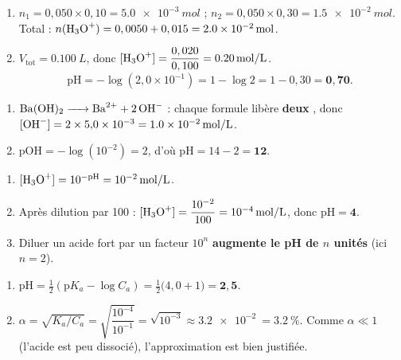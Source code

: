 \documentclass[11pt,a4paper]{article}
\begin{document}

\begin{corrige}
\begin{enumerate}[label=\alph*)]
  \item $n_1 = 0,050 \times 0,10 = \qty{5,0e-3}{mol}$ ; $n_2 = 0,050 \times 0,30 = \qty{1,5e-2}{mol}$.
        Total : $n(\ce{H3O+}) = 0,0050 + 0,015 = \qty{2,0e-2}{mol}$.
  \item $V_{\text{tot}} = \qty{0,100}{L}$, donc $[\ce{H3O+}] = \dfrac{0,020}{0,100} = \qty{0,20}{mol\per L}$.
        \[ \mathrm{pH} = -\log(2{,}0\times10^{-1}) = 1 - \log 2 = 1 - 0{,}30 = \mathbf{0{,}70}. \]
\end{enumerate}
\end{corrige}

\begin{corrige}
\begin{enumerate}[label=\alph*)]
  \item $\ce{Ba(OH)2 -> Ba^{2+} + 2 OH-}$ : chaque formule libère \textbf{deux} , donc
        $[\ce{OH-}] = 2 \times 5{,}0\times10^{-3} = \qty{1,0e-2}{mol\per L}$.
  \item $\mathrm{pOH} = -\log(10^{-2}) = 2$, d'où $\mathrm{pH} = 14 - 2 = \mathbf{12}$.
\end{enumerate}
\end{corrige}

\begin{corrige}
\begin{enumerate}[label=\alph*)]
  \item $[\ce{H3O+}] = 10^{-\mathrm{pH}} = \qty{e-2}{mol\per L}$.
  \item Après dilution par \num{100} : $[\ce{H3O+}] = \dfrac{10^{-2}}{100} = \qty{e-4}{mol\per L}$, donc
        $\mathrm{pH} = \mathbf{4}$.
  \item Diluer un acide fort par un facteur $10^{n}$ \textbf{augmente le pH de $n$ unités} (ici $n=2$).
\end{enumerate}
\end{corrige}

\begin{corrige}
\begin{enumerate}[label=\alph*)]
  \item $\mathrm{pH} = \tfrac12(\mathrm{p}K_a - \log C_a) = \tfrac12\bigl(4{,}0 + 1\bigr) = \mathbf{2{,}5}$.
  \item $\alpha = \sqrt{K_a/C_a} = \sqrt{\dfrac{10^{-4}}{10^{-1}}} = \sqrt{10^{-3}} \approx \qty{3,2e-2}{}
        = \qty{3,2}{\percent}$. Comme $\alpha \ll 1$ (l'acide est peu dissocié), l'approximation est bien
        justifiée.
\end{enumerate}
\end{corrige}
\end{document}
